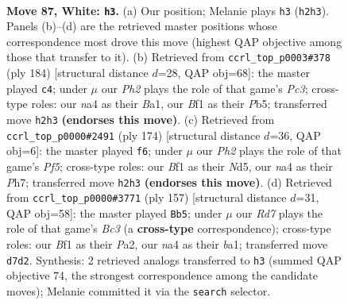 \documentclass[11pt]{article}
\begin{document}
\clearpage

\begin{figure}[p]\centering
\begin{subfigure}{0.46\textwidth}\centering
\resizebox{\linewidth}{!}{%
\newchessgame
\chessboard[
  setfen={8/2NR4/8/5Pk1/np4P1/5b2/7P/5BK1 w - - 2 87},
  showmover=false,
  pgfstyle=straightmove, color=movearrow, markmove={h2-h3}
]}
\caption{}
\end{subfigure}\hfill
\begin{subfigure}{0.46\textwidth}\centering
\resizebox{\linewidth}{!}{%
\newchessgame
\chessboard[
  setfen={8/8/3kP3/1P1P4/3K4/2P2b2/p7/B7 w - - 3 93},
  showmover=false,
  pgfstyle=straightmove, color=movearrow, markmove={c3-c4}
]}
\caption{}
\end{subfigure}
\\[4pt]
\begin{subfigure}{0.46\textwidth}\centering
\resizebox{\linewidth}{!}{%
\newchessgame
\chessboard[
  setfen={4b2b/7P/8/p2N1PK1/P7/3k4/8/8 w - - 4 88},
  showmover=false,
  pgfstyle=straightmove, color=movearrow, markmove={f5-f6}
]}
\caption{}
\end{subfigure}\hfill
\begin{subfigure}{0.46\textwidth}\centering
\resizebox{\linewidth}{!}{%
\newchessgame
\chessboard[
  setfen={8/3n4/2bP4/5k1p/6pK/8/p7/B3R3 b - - 3 79},
  showmover=false,
  pgfstyle=straightmove, color=movearrow, markmove={c6-b5}
]}
\caption{}
\end{subfigure}
\caption{\textbf{Move 87, White: \texttt{h3}.} (a) Our position; Melanie plays \texttt{h3} (\texttt{h2h3}). Panels (b)--(d) are the retrieved master positions whose correspondence most drove this move (highest QAP objective among those that transfer to it). (b) Retrieved from \texttt{ccrl\_top\_p0003\#378} (ply 184) [structural distance $d$=28, QAP obj=68]: the master played \texttt{c4}; under $\mu$ our \emph{Ph2} plays the role of that game's \emph{Pc3}; cross-type roles: our \emph{n}a4 as their \emph{B}a1, our \emph{B}f1 as their \emph{P}b5; transferred move \texttt{h2h3} \textbf{(endorses this move)}. (c) Retrieved from \texttt{ccrl\_top\_p0000\#2491} (ply 174) [structural distance $d$=36, QAP obj=6]: the master played \texttt{f6}; under $\mu$ our \emph{Ph2} plays the role of that game's \emph{Pf5}; cross-type roles: our \emph{B}f1 as their \emph{N}d5, our \emph{n}a4 as their \emph{P}h7; transferred move \texttt{h2h3} \textbf{(endorses this move)}. (d) Retrieved from \texttt{ccrl\_top\_p0000\#3771} (ply 157) [structural distance $d$=31, QAP obj=58]: the master played \texttt{Bb5}; under $\mu$ our \emph{Rd7} plays the role of that game's \emph{Bc3} (a \textbf{cross-type} correspondence); cross-type roles: our \emph{B}f1 as their \emph{P}a2, our \emph{n}a4 as their \emph{b}a1; transferred move \texttt{d7d2}. Synthesis: 2 retrieved analogs transferred to \texttt{h3} (summed QAP objective 74, the strongest correspondence among the candidate moves); Melanie committed it via the \texttt{search} selector.}
\label{fig:thought-m172}
\end{figure}
\end{document}
